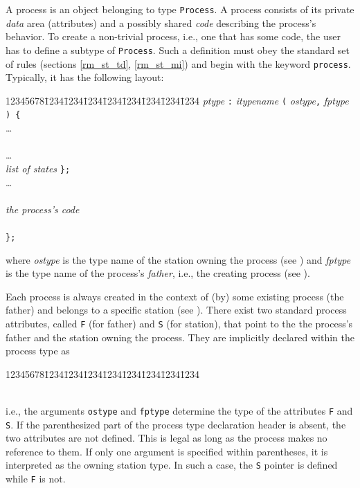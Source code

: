 A process is an object belonging to type {\tt Process}.
A process consists of its private {\em data\/} area (attributes)
and a possibly shared
{\em code\/} describing the process's behavior.
To create a non-trivial process, i.e., one that has some code, the user
has to define a subtype of {\tt Process}.
Such a definition must obey the standard set of rules (sections
\ref{rm_st_td}, \ref{rm_st_mi}) and begin with the keyword
{\tt process}.
Typically, it has the following layout:
{\tt\begin{tabbing}
12345678\=1234\=1234\=1234\=1234\=1234\=1234\=1234\=1234\kill
{} {\em ptype\/} {\tt :} {\em itypename\/} {\tt (} {\em ostype}{\tt ,} {\em fptype\/} {\tt ) \{} \\
\> \>\ldots \\
\>  \\
\> \>\ldots \\
\>  {\em list of states\/} {\tt \};} \\
\> \>\ldots \\
\>  \\
\> \> \> {\em the process's code} \\
\> \>{\tt \};} \\
\> {\tt \};}
\end{tabbing}}
\noindent
where {\em ostype\/}
is the type name of the station owning the process (see )
and {\em fptype\/}
is the type name of the process's {\em father}, i.e., the creating process
(see ).

Each process is always created in the context of (by) some existing process
(the father) and belongs to a specific station (see ).
There exist two standard process attributes, called
{\tt F} (for father) and {\tt S} (for station), that point to the
the process's father and the station owning the process.
They are implicitly declared within the process type as
{\tt\begin{tabbing}
12345678\=1234\=1234\=1234\=1234\=1234\=1234\=1234\=1234\kill
{}\>\\
\>\\
\end{tabbing}}
\noindent
i.e., the arguments {\tt ostype} and {\tt fptype}
determine the type of the attributes {\tt F} and {\tt S}.
If the parenthesized part of the process type
declaration header is absent, the two attributes are not defined.
This is legal as long as the process makes no reference to them.
If only one argument is specified within parentheses, it is interpreted as
the owning station type.
In such a case, the {\tt S} pointer is defined while {\tt F} is not.

